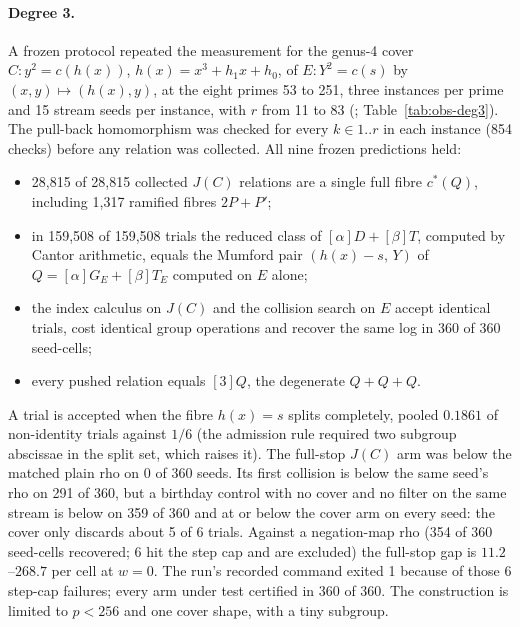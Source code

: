 \paragraph{Degree 3.} A frozen protocol repeated the measurement for the
genus-4 cover $C:y^2=c(h(x))$, $h(x)=x^3+h_1x+h_0$, of $E:Y^2=c(s)$ by
$(x,y)\mapsto(h(x),y)$, at the eight primes 53 to 251, three instances per
prime and 15 stream seeds per instance, with $r$ from 11 to 83
(;
Table~\ref{tab:obs-deg3}). The pull-back homomorphism was checked for every
$k\in1..r$ in each instance (854 checks) before any relation was collected.
All nine frozen predictions held:
\begin{itemize}
\item 28{,}815 of 28{,}815 collected $J(C)$ relations are a single full fibre
  $c^*(Q)$, including 1{,}317 ramified fibres $2P+P'$;
\item in 159{,}508 of 159{,}508 trials the reduced class of $[\alpha]D+[\beta]T$,
  computed by Cantor arithmetic, equals the Mumford pair $(h(x)-s,\,Y)$ of
  $Q=[\alpha]G_E+[\beta]T_E$ computed on $E$ alone;
\item the index calculus on $J(C)$ and the collision search on $E$ accept
  identical trials, cost identical group operations and recover the same
  log in 360 of 360 seed-cells;
\item every pushed relation equals $[3]Q$, the degenerate $Q+Q+Q$.
\end{itemize}
A trial is accepted when the fibre $h(x)=s$ splits completely, pooled
$0.1861$ of non-identity trials against $1/6$ (the admission rule required
two subgroup abscissae in the split set, which raises it). The full-stop
$J(C)$ arm was below the matched plain rho on 0 of 360 seeds. Its first
collision is below the same seed's rho on 291 of 360, but a birthday control
with no cover and no filter on the same stream is below on 359 of 360 and at
or below the cover arm on every seed: the cover only discards about 5 of 6
trials. Against a negation-map rho (354 of 360 seed-cells recovered; 6 hit
the step cap and are excluded) the full-stop gap is $11.2$--$268.7$ per cell at
$w=0$. The run's recorded command exited 1 because of those 6 step-cap
failures; every arm under test certified in 360 of 360. The construction is
limited to $p<256$ and one cover shape, with a tiny subgroup.

